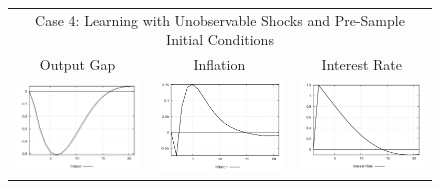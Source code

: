\begin{figure}
\begin{tabular}{ccc}
\multicolumn{3}{c}{Case 4: Learning with Unobservable Shocks and Pre-Sample Initial Conditions}\\
Output Gap & Inflation & Interest Rate \\ 
\includegraphics[scale=0.28]{results_wlsinit/Output_mpshock_irf.png} & 
\includegraphics[scale=0.28]{results_wlsinit/Inflation_mpshock_irf.png} & 
\includegraphics[scale=0.28]{results_wlsinit/Interest_Rate_mpshock_irf.png} \\ 
\end{tabular}
\end{figure}
